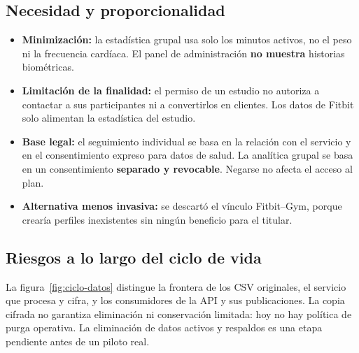 \documentclass[11pt]{article}
\begin{document}
\subsection{Necesidad y proporcionalidad}
\begin{itemize}[nosep]
  \item \textbf{Minimización:} la estadística grupal usa solo los minutos activos, no el peso ni la frecuencia cardíaca. El panel de administración \textbf{no muestra} historias biométricas.
  \item \textbf{Limitación de la finalidad:} el permiso de un estudio no autoriza a contactar a sus participantes ni a convertirlos en clientes. Los datos de Fitbit solo alimentan la estadística del estudio.
  \item \textbf{Base legal:} el seguimiento individual se basa en la relación con el servicio y en el consentimiento expreso para datos de salud. La analítica grupal se basa en un consentimiento \textbf{separado y revocable}. Negarse no afecta el acceso al plan.
  \item \textbf{Alternativa menos invasiva:} se descartó el vínculo Fitbit--Gym, porque crearía perfiles inexistentes sin ningún beneficio para el titular.
\end{itemize}

\subsection{Riesgos a lo largo del ciclo de vida}
La figura~\ref{fig:ciclo-datos} distingue la frontera de los CSV originales, el servicio que procesa y cifra, y los consumidores de la API y sus publicaciones. La copia cifrada no garantiza eliminación ni conservación limitada: hoy no hay política de purga operativa. La eliminación de datos activos y respaldos es una etapa pendiente antes de un piloto real.
\end{document}
